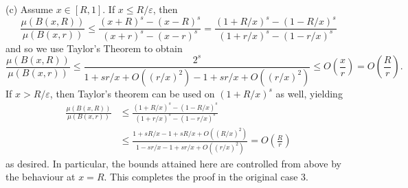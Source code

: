 \noindent (c) Assume  $x \in [R,1]$. If $x \leq R/\varepsilon$, then 
\[
\frac{\mu(B(x,R))}{\mu(B(x,r))} \le \frac{(x+R)^s - (x-R)^s}{(x+r)^s - (x-r)^s} = \frac{(1+R/x)^s - (1-R/x)^s}{(1+r/x)^s - (1-r/x)^s}
\]
and so we use Taylor's Theorem  to obtain
\[
\frac{\mu(B(x,R))}{\mu(B(x,r))} \le \frac{2^s}{1+sr/x + O((r/x)^2)- 1 + sr/x + O((r/x)^2)} \le O\left(\frac{x}{r}\right) = O\left(\frac{R}{r}\right).
\]
If $x > R/\varepsilon$, then  Taylor's theorem can be used on $(1+R/x)^s$ as well, yielding
\begin{align*}
    \frac{\mu(B(x,R))}{\mu(B(x,r))} &\le \frac{(1+R/x)^s - (1-R/x)^s}{(1+r/x)^s - (1-r/x)^s} \\
    &\le \frac{1+sR/x - 1 + sR/x + O((R/x)^2)}{1-sr/x -1 + sr/x + O((r/x)^2)} = O\left(\frac{R}{r}\right)
\end{align*}
as desired. In particular, the bounds attained here are controlled from above by the  behaviour at $x= R$.   This completes the proof in the original case 3.



